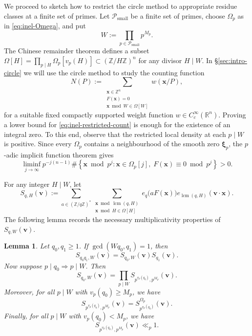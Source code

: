 \documentclass[a4paper,11pt, twoside,reqno]{amsart}
\theoremstyle{plain}
\newtheorem{lemma}[thm]{Lemma}
\theoremstyle{definition}
\theoremstyle{remark}
\newcommand{\F}{\mathbb{F}}
\newcommand{\Z}{\mathbb{Z}}
\newcommand{\bfv}{\bm{v}}
\newcommand{\bfx}{\bm{x}}
\newcommand{\RR}{\mathbb{R}}
\renewcommand{\ge}{\geqslant}
\newcommand{\lcm}{\operatorname{lcm}}
\numberwithin{equation}{section}
\begin{document}
We proceed to sketch how to restrict the circle method to appropriate residue classes
at a finite set of primes.
Let $\mathcal P_{\mathrm{small}}$ be a finite set of primes, choose $\Omega_p$ as in \eqref{eq:inel-Omega}, and put
\begin{equation}
\label{large-fixed-W}
W := \prod_{p\in\mathcal P_{\mathrm{small}}}p^{M_p}.
\end{equation}
The Chinese remainder theorem defines a subset
$\Omega[H] = \prod_{p\mid H} \Omega_p[v_p(H)] \subset(\Z/H\Z)^n$
for any divisor $H\mid W$.
In \S\ref{sec:intro-circle} we will use the circle method to study the counting function
\begin{equation}\label{eq:inel-restricted-count}
N(P)
:= \sum_{\substack{\bfx\in\Z^n\\F(\bfx)=0\\
\bfx\bmod W\in\Omega[W]}}
w(\bfx/P),
\end{equation}
for a suitable fixed compactly supported weight function $w\in C^\infty_c(\RR^n)$.
Proving a lower bound for
\eqref{eq:inel-restricted-count} is enough for the existence of an
integral zero.
To this end, observe that the restricted local density at each $p\mid W$ is positive.
Since every $\Omega_p$ contains a neighbourhood of the smooth zero
$\boldsymbol{\xi}_p$, the $p$-adic implicit function theorem gives
\begin{equation}
\label{eq:localised-pos-density}
\liminf_{j\to\infty}p^{-j(n-1)}
\#\left\{\bfx\bmod p^j:
\bfx\in\Omega_p[j],\;F(\bfx)\equiv0\bmod{p^j}\right\}>0.
\end{equation}

For any integer $H\mid W$, let
\begin{equation}\label{eq:inel-global-complete-sum}
S_{q,H}(\bfv)
:=\sum_{a\in(\Z/q\Z)^\ast}
\sum_{\substack{\bfx\bmod\lcm(q,H)\\
\bfx\bmod H\in\Omega[H]}}
e_q\bigl(aF(\bfx)\bigr)e_{\lcm(q,H)}(\bfv\cdot\bfx).
\end{equation}
The following lemma records the necessary multiplicativity properties of $S_{q,W}(\bfv)$.
\begin{lemma}
\label{lem:restricted-multiplicative}
Let $q_0,q_1\ge 1$.
If $\gcd(Wq_0,q_1)=1$, then $$S_{q_0q_1,W}(\bfv)
= S_{q_0,W}(\bfv) S_{q_1}(\bfv).$$
Now suppose $p\mid q_0 \Rightarrow p\mid W$.
Then $$S_{q_0,W}(\bfv) = \prod_{p\mid W} S_{p^{v_p(q_0)},p^{M_p}}(\bfv).$$
Moreover, for all $p\mid W$ with $v_p(q_0) \ge M_p$,
we have $$S_{p^{v_p(q_0)},p^{M_p}}(\bfv) = S_{p^{v_p(q_0)}}^{\Omega_p}(\bfv).$$
Finally, for all $p\mid W$ with $v_p(q_0) < M_p$,
we have $$S_{p^{v_p(q_0)},p^{M_p}}(\bfv) \ll_p 1.$$
\end{lemma}
\end{document}
